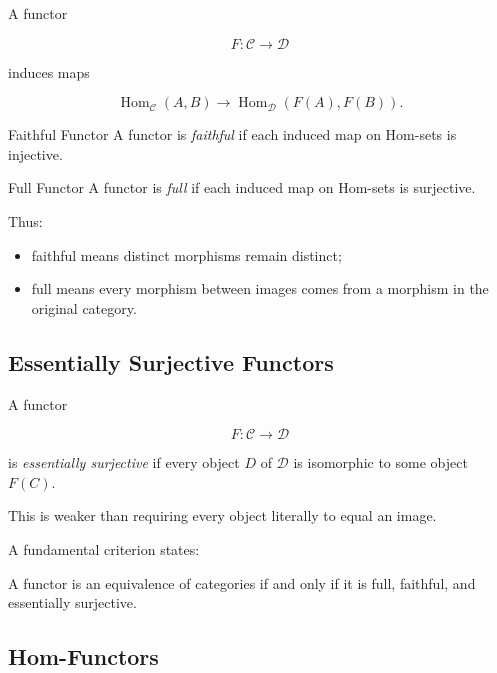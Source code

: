 A functor

\[ F:\mathcal C\to\mathcal D \]

induces maps

\[ \operatorname{Hom}_{\mathcal C}(A,B)
\to
\operatorname{Hom}_{\mathcal D}(F(A),F(B)). \]

\begin{definitionbox}{Faithful Functor}
A functor is \emph{faithful} if each induced map on Hom-sets is injective.
\end{definitionbox}

\begin{definitionbox}{Full Functor}
A functor is \emph{full} if each induced map on Hom-sets is surjective.
\end{definitionbox}

Thus:

\begin{itemize}
    \item faithful means distinct morphisms remain distinct;
    \item full means every morphism between images comes from a morphism in
    the original category.
\end{itemize}

\subsection{Essentially Surjective Functors}
\label{subsec:essentially-surjective}

A functor

\[ F:\mathcal C\to\mathcal D \]

is \emph{essentially surjective} if every object \(D\) of \(\mathcal D\)
is isomorphic to some object \(F(C)\).

This is weaker than requiring every object literally to equal an image.

A fundamental criterion states:

\begin{theorem}
A functor is an equivalence of categories if and only if it is full,
faithful, and essentially surjective.
\end{theorem}

\subsection{Hom-Functors}
\label{subsec:hom-functors}

